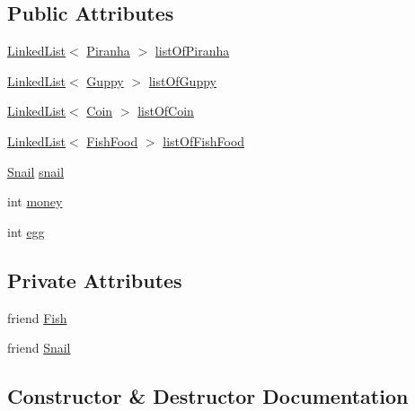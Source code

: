 \subsection*{Public Attributes}
\begin{DoxyCompactItemize}
\item 
\mbox{\hyperlink{class_linked_list}{Linked\+List}}$<$ \mbox{\hyperlink{class_piranha}{Piranha}} $>$ \mbox{\hyperlink{class_aquarium_a5914c6e8860d90a55bb153bd7190c75d}{list\+Of\+Piranha}}
\item 
\mbox{\hyperlink{class_linked_list}{Linked\+List}}$<$ \mbox{\hyperlink{class_guppy}{Guppy}} $>$ \mbox{\hyperlink{class_aquarium_a974abef2727deb91bc52d5b4b5ed93cc}{list\+Of\+Guppy}}
\item 
\mbox{\hyperlink{class_linked_list}{Linked\+List}}$<$ \mbox{\hyperlink{class_coin}{Coin}} $>$ \mbox{\hyperlink{class_aquarium_a81d4d13fb34cb230fb8aeb7c578edd8e}{list\+Of\+Coin}}
\item 
\mbox{\hyperlink{class_linked_list}{Linked\+List}}$<$ \mbox{\hyperlink{class_fish_food}{Fish\+Food}} $>$ \mbox{\hyperlink{class_aquarium_a8792367505556ece7fd7ce0fe63dbf51}{list\+Of\+Fish\+Food}}
\item 
\mbox{\hyperlink{class_snail}{Snail}} \mbox{\hyperlink{class_aquarium_a031f639386ae1f30bda7d97f75781b17}{snail}}
\item 
int \mbox{\hyperlink{class_aquarium_a763165a06487cca929dfe5601a9254cb}{money}}
\item 
int \mbox{\hyperlink{class_aquarium_a4f12b488315834787132112b4de5f186}{egg}}
\end{DoxyCompactItemize}
\subsection*{Private Attributes}
\begin{DoxyCompactItemize}
\item 
friend \mbox{\hyperlink{class_aquarium_ae7f1e47f6e70e618d97f6f6497556bd2}{Fish}}
\item 
friend \mbox{\hyperlink{class_aquarium_af6f4e7e46567d5a7c55c4c6529d81deb}{Snail}}
\end{DoxyCompactItemize}


\subsection{Constructor \& Destructor Documentation}
\mbox{\label{class_aquarium_a0176cc59bd34e39fd3d79d56d4db4d08}} 

